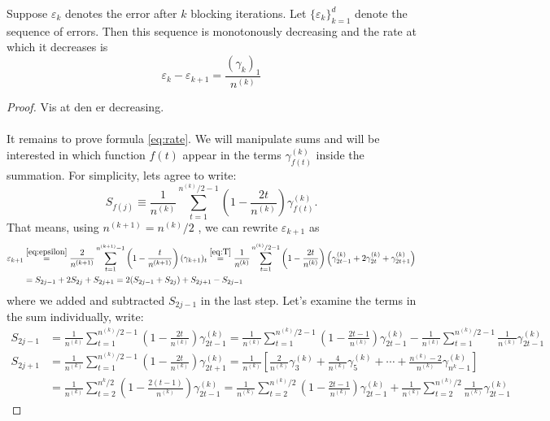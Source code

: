 \documentclass[11pt,english,a4paper]{article}
\begin{document}
\begin{prop}
Suppose $\varepsilon_k$ denotes the error after $k$ blocking iterations. Let $\{\varepsilon_k\}_{  k=1}^d$ denote the sequence of errors. Then this sequence is monotonously decreasing and the rate at which it decreases is
\begin{equation}
\varepsilon_k - \varepsilon_{  k+1} = \frac{(\gamma_k)_1 }{n^{(k)}} \label{eq:rate}
\end{equation}
\begin{proof}
Vis at den er decreasing.\\
\\
It remains to prove formula \eqref{eq:rate}. We will manipulate sums and will be interested in which function $f(t)$ appear in the terms $\gamma^{(k)}_{f(t)}$ inside the summation. For simplicity, lets agree to write: 
\[S_{f(j)} \equiv \frac{1}{n^{(k)}} \sum_{t=1}^{n^{(k)}/2-1} \left( 1 - \frac{2t}{n^{(k)}} \right) \gamma^{(k)}_{f(t)}. \]
That means, using $n^{(k+1)} = n^{(k)}/2$ , we can rewrite $\varepsilon_{  k+1}$ as
\begin{align}
\varepsilon_{  k+1} &\stackrel{\eqref{eq:epsilon}}{=} \frac{2}{n^{(k+1)}} \sum_{t=1}^{n^{(k+1)}-1} \left( 1 - \frac{t}{n^{(k+1)}} \right) (\gamma_{k+1})_t \stackrel{\eqref{eq:T}}{=} \frac{1}{n^{(k)}} \sum_{t=1}^{n^{(k)}/2-1} \left( 1 - \frac{2t}{n^{(k)}} \right) \left( \gamma^{(k)}_{2t - 1} + 2\gamma^{(k)}_{2t} + \gamma^{(k)}_{2t + 1}\right) \nonumber \\
&= S_{2j-1} + 2S_{2j} + S_{2j+1} = 2(S_{2j-1} + S_{2j}) + S_{2j+1} - S_{2j-1} \label{eq:epsilonkpp}
\end{align}
where we added and subtracted $S_{2j - 1}$ in the last step. Let's examine the terms in the sum individually, write:
\begin{align}
S_{2j-1} &= \frac{1}{n^{(k)}} \sum_{t=1}^{n^{(k)}/2-1} \left( 1 - \frac{2t}{n^{(k)}} \right) \gamma^{(k)}_{2t - 1}  = \frac{1}{n^{(k)}}\sum_{t=1}^{n^{(k)}/2-1} \left( 1 - \frac{2t-1}{n^{(k)}}\right) \gamma^{(k)}_{2t - 1} - \frac{1}{n^{(k)}} \sum_{t=1}^{n^{(k)}/2-1} \frac{1}{n^{(k)}} \gamma^{(k)}_{2t - 1} \label{eq:sumB}
\\
S_{2j+1} &= \frac{1}{n^{(k)}} \sum_{t=1}^{n^{(k)}/2-1} \left( 1 - \frac{2t}{n^{(k)}} \right) \gamma^{(k)}_{2t + 1}  = \frac{1}{n^{(k)}} \left[ \frac{2}{n^{(k)}} \gamma^{(k)}_{3} + \frac{4}{n^{(k)}} \gamma^{(k)}_{5} + \cdots + \frac{n^{(k)} - 2}{n^{(k)}} \gamma^{(k)}_{n^{k} - 1}\right]\nonumber
 \\
 &= \frac{1}{n^{(k)}}\sum_{t=2}^{n^{k}/2} \left( 1 - \frac{2(t-1)}{n^{(k)}} \right) \gamma^{(k)}_{2t-1} = \frac{1}{n^{(k)}} \sum_{t=2}^{n^{(k)}/2} \left( 1 - \frac{2t-1}{n^{(k)}} \right) \gamma^{(k)}_{2t - 1} + \frac{1}{n^{(k)}}\sum_{t=2}^{n^{(k)}/2} \frac{1}{n^{(k)}} \gamma^{(k)}_{2t - 1}  \nonumber

\end{align}
\end{proof}
\end{prop}
\end{document}
